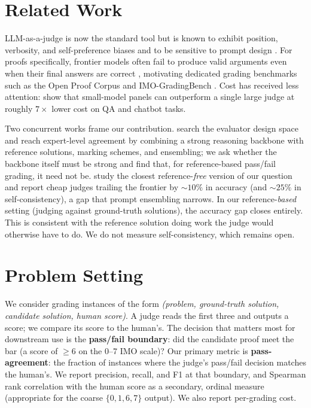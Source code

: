 \documentclass{article}
\begin{document}
\section{Related Work}
\label{sec:related}

LLM-as-a-judge \citep{zheng2023judging} is now the standard tool but is known to
exhibit position, verbosity, and self-preference biases and to be sensitive to
prompt design \citep{gu2024survey}. For proofs specifically, frontier models often
fail to produce valid arguments even when their final answers are correct
\citep{petrov2025proof}, motivating dedicated grading benchmarks such as the Open Proof
Corpus \citep{dekoninck2025opc} and IMO-GradingBench \citep{luong2025robust}. Cost
has received less attention: \citet{verga2024poll} show that small-model panels can
outperform a single large judge at roughly $7\times$ lower cost on QA and chatbot
tasks.

Two concurrent works frame our contribution. \citet{ma2026proofgrader} search the
evaluator design space and reach expert-level agreement by combining a strong
reasoning backbone with reference solutions, marking schemes, and ensembling; we
ask whether the backbone itself must be strong and find that, for reference-based
pass/fail grading, it need not be. \citet{naik2026frontier} study the closest
reference-\emph{free} version of our question and report cheap judges trailing the
frontier by ${\sim}10\%$ in accuracy (and ${\sim}25\%$ in self-consistency), a
gap that prompt ensembling narrows. In our reference-\emph{based} setting (judging
against ground-truth solutions), the accuracy gap closes entirely. This is
consistent with the reference solution doing work the judge would otherwise have
to do. We do not measure self-consistency, which remains open.

\section{Problem Setting}
\label{sec:setting}

We consider grading instances of the form \emph{(problem, ground-truth solution,
candidate solution, human score)}. A judge reads the first three and outputs a
score; we compare its score to the human's. The decision that matters most for
downstream use is the \textbf{pass/fail boundary}: did the candidate proof meet
the bar (a score of $\geq 6$ on the 0--7 IMO scale)? Our primary metric is
\textbf{pass-agreement}: the fraction of instances where the judge's pass/fail
decision matches the human's. We report precision, recall, and F1 at that
boundary, and Spearman rank correlation with the human score as a secondary,
ordinal measure (appropriate for the coarse $\{0, 1, 6, 7\}$ output). We also
report per-grading cost.
\end{document}
